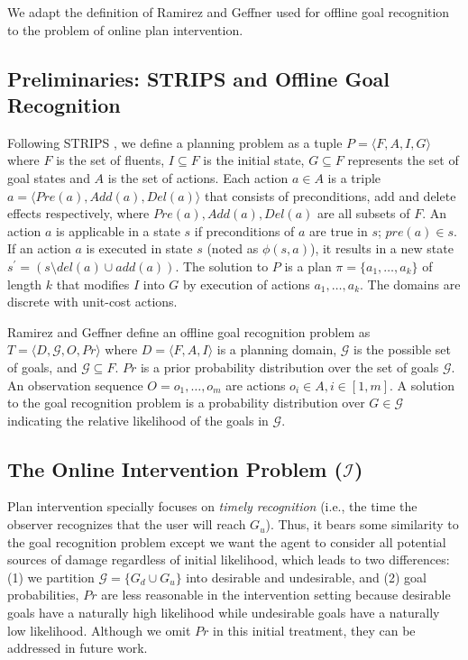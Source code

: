 
We adapt the definition of Ramirez and Geffner  used for offline goal recognition to the problem of  online plan intervention.
\subsection{Preliminaries: STRIPS and Offline Goal Recognition}
Following STRIPS \cite{fikes1971strips}, we define a planning problem as a tuple $ P = \langle F, A, I, G \rangle$ where $F$ is the set of fluents, $I\subseteq F$ is the initial state, $G  \subseteq F$ represents the set of goal states and $A$ is the set of actions. Each action $a \in A$ is a triple $a=\langle Pre(a), Add(a), Del(a)\rangle$ that consists of preconditions, add and delete effects respectively, where $Pre(a), Add(a), Del(a)$ are all subsets of $F$. An action $a$ is applicable in a state $s$ if preconditions of $a$ are true in $s$; $pre(a) \in s$. If an action $a$ is executed in state $s$ (noted as $\phi(s,a)$), it results in a new state $s^{\prime} = (s \setminus del(a) \cup add(a))$.  The solution to $P$ is a plan $\pi = \{a_1, \dots ,a_k\}$ of length $k$ that modifies $I$ into $G$ by execution of actions $a_1, \dots ,a_k$.  The domains are discrete with unit-cost actions.

Ramirez and Geffner  define an offline goal recognition problem as $T= \langle D, \mathcal{G}, O, Pr \rangle$ where $D=\langle F, A, I \rangle$ is a planning domain, $\mathcal{G}$ is the possible set of goals, and $\mathcal{G} \subseteq F$. $Pr$ is a prior probability distribution over the set of goals $\mathcal{G}$. An observation sequence $O = o_1, \ldots , o_m$ are actions $o_i \in A, i \in[1,m]$. A solution to the goal recognition problem is a probability distribution over $G \in \mathcal{G}$ indicating the relative likelihood of the goals in $\mathcal{G}$.

\subsection{The Online Intervention Problem ($\mathcal{I}$)}
Plan intervention specially focuses on \textit{timely recognition} (i.e., the time the observer recognizes  that the user will reach $G_u$). 
Thus, it bears some similarity to the goal recognition problem except we want the agent to consider all potential sources of damage regardless of initial likelihood, which leads to two differences: (1) we partition $\mathcal{G} = \lbrace G_d \cup G_u \rbrace$ into desirable and undesirable, and (2)  goal probabilities, $Pr$ are less reasonable in the intervention setting because desirable goals have a naturally high likelihood while undesirable goals have a naturally low likelihood.  
Although we omit $Pr$ in this initial treatment, they can be addressed in future work.

